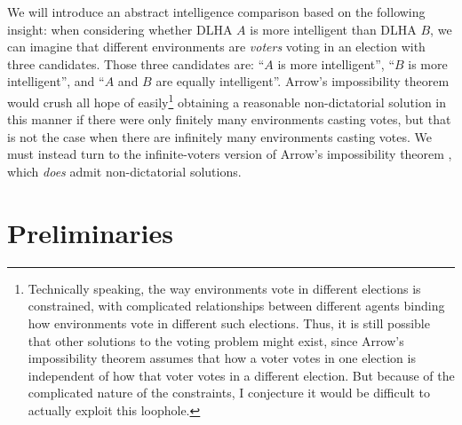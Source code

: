 \documentclass[twoside,11pt]{article}
\begin{document}
We will introduce an abstract intelligence comparison
based on the following insight:
when considering whether DLHA $A$ is more intelligent than DLHA $B$,
we can imagine that different environments are \emph{voters} voting in an election with
three candidates. Those three candidates are: ``$A$ is more intelligent'',
``$B$ is more intelligent'', and ``$A$ and $B$ are equally intelligent''.
Arrow's impossibility theorem \citep{arrow} would crush all hope of
easily\footnote{Technically speaking, the way environments vote in different elections
is constrained, with complicated relationships between different agents binding how
environments vote in different such elections. Thus, it is still possible that
other solutions to the voting problem might exist, since Arrow's impossibility theorem
assumes that
how a voter votes in one election is independent of how that voter votes
in a different election. But
because of the complicated nature of the constraints, I conjecture it
would be difficult to actually exploit this loophole.}
obtaining a
reasonable non-dictatorial solution in this manner if there were only finitely many
environments
casting votes, but that is not the case when there are infinitely many environments
casting votes.
We must instead turn to the infinite-voters version of
Arrow's impossibility theorem \citep{kirman} \citep[see also][]{fishburn},
which \emph{does} admit non-dictatorial solutions.


\section{Preliminaries}
\end{document}
